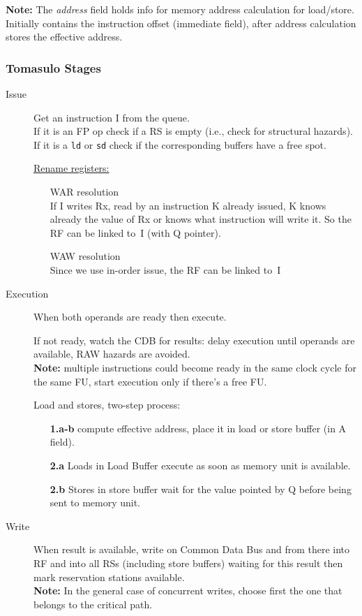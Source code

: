 \textbf{Note:} The \textit{address} field holds info for memory address calculation for load/store.
Initially contains the instruction offset (immediate field), after address calculation stores the effective address.

\subsubsection{Tomasulo Stages}
\begin{description}
    \item[Issue] Get an instruction I from the queue.\\
    If it is an FP op check if a RS is empty (i.e., check for structural hazards).\\
    If it is a \verb|ld| or \verb|sd| check if the corresponding buffers have a free spot.

    \underline{Rename registers:}
    \begin{itemize}
        \item[\textrightarrow] WAR resolution\\
    If I writes Rx, read by an instruction K already issued, K
    knows already the value of Rx or knows what instruction
    will write it.
    So the RF can be linked to~I (with Q pointer).
        \item[\textrightarrow] WAW resolution\\
    Since we use in-order issue, the RF can be linked to~I
    \end{itemize}

    \item[Execution] When both operands are ready then execute.

    If not ready, watch the CDB for results: delay execution until operands are available, RAW
    hazards are avoided.\\
    \textbf{Note:} multiple instructions could become ready in the
    same clock cycle for the same FU, start execution only if there's a free FU\@.

    Load and stores, two-step process:
    \begin{itemize}[noitemsep]
        \item[\textbf{1.a-b}] compute effective address, place it in load or
        store buffer (in A field).
        \item[\textbf{2.a}] Loads in Load Buffer execute as soon as memory unit is
    available.
        \item[\textbf{2.b}] Stores in store buffer wait for the value pointed by Q before
    being sent to memory unit.
    \end{itemize}

    \item[Write] When result is available, write on Common Data Bus and from there into RF and into all RSs
    (including store buffers) waiting for this result then mark reservation stations available.\\
    \textbf{Note:} In the general case of concurrent writes, choose first the one that belongs to the critical path.
\end{description}


